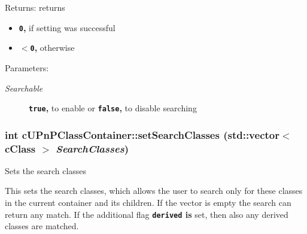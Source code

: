 \begin{Desc}
\item[Returns:]returns\begin{itemize}
\item {\bf {\tt 0},} if setting was successful\item {\bf {\tt $<$0},} otherwise \end{itemize}
\end{Desc}
\begin{Desc}
\item[Parameters:]
\begin{description}
\item[{\em Searchable}]{\bf {\tt true},} to enable or {\bf {\tt false},} to disable searching \end{description}
\end{Desc}
\hypertarget{classcUPnPClassContainer_aa34f20a75725837af2168a192687a51}{
\subsubsection[{setSearchClasses}]{\setlength{\rightskip}{0pt plus 5cm}int cUPnPClassContainer::setSearchClasses (std::vector$<$ {\bf cClass} $>$ {\em SearchClasses})}}
\label{classcUPnPClassContainer_aa34f20a75725837af2168a192687a51}


Sets the search classes

This sets the search classes, which allows the user to search only for these classes in the current container and its children. If the vector is empty the search can return any match. If the additional flag {\bf {\tt derived} is} set, then also any derived classes are matched.


